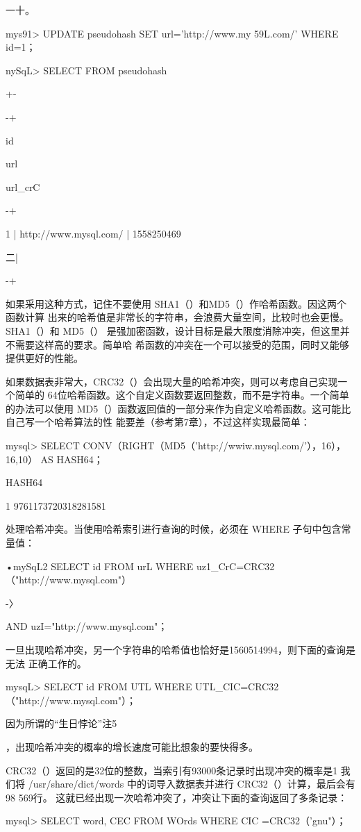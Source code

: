 一十。

mys91> UPDATE pseudohash SET url='http://www.my 59L.com/' WHERE id=1；

nySqL> SELECT FROM pseudohash

+-

-+

id

url

url\_crC

-+

1 | http://www.mysql.com/ | 1558250469

二|

-+

如果采用这种方式，记住不要使用 SHA1（）和MD5（）作哈希函数。因这两个函数计算
出来的哈希值是非常长的字符串，会浪费大量空间，比较时也会更慢。SHA1（）和 MD5（）
是强加密函数，设计目标是最大限度消除冲突，但这里并不需要这样高的要求。简单哈
希函数的冲突在一个可以接受的范围，同时又能够提供更好的性能。

如果数据表非常大，CRC32（）会出现大量的哈希冲突，则可以考虑自己实现一个简单的
64位哈希函数。这个自定义函数要返回整数，而不是字符串。一个简单的办法可以使用
MD5（）函数返回值的一部分来作为自定义哈希函数。这可能比自己写一个哈希算法的性
能要差（参考第7章），不过这样实现最简单：

mysql> SELECT CONV（RIGHT（MD5（'http://wwiw.mysql.com/'），16），16,10） AS HASH64；

HASH64

1 9761173720318281581

处理哈希冲突。当使用哈希索引进行查询的时候，必须在 WHERE 子句中包含常量值：

•mySqL2 SELECT id FROM urL WHERE uz1\_CrC=CRC32（"http://www.mysql.com"）

-〉

AND uzI="http://www.mysql.com"；

一旦出现哈希冲突，另一个字符串的哈希值也恰好是1560514994，则下面的查询是无法
正确工作的。

mysqL> SELECT id FROM UTL WHERE UTL\_CIC=CRC32（"http://www.mysql.com"）；

因为所谓的“生日悖论”注5

，出现哈希冲突的概率的增长速度可能比想象的要快得多。

CRC32（）返回的是32位的整数，当索引有93000条记录时出现冲突的概率是1%
我们将 /usr/share/dict/words 中的词导入数据表并进行 CRC32（）计算，最后会有98 569行。
这就已经出现一次哈希冲突了，冲突让下面的查询返回了多条记录：

mysql> SELECT word, CEC FROM WOrds WHERE CIC =CRC32（'gnu"）；

